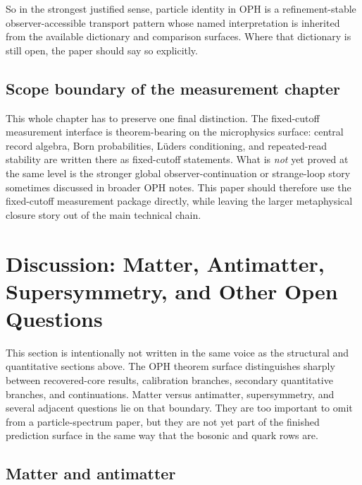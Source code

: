 \documentclass[11pt]{article}
\begin{document}
So in the strongest justified sense, particle identity in OPH is a refinement-stable
observer-accessible transport pattern whose named interpretation is inherited from the
available dictionary and comparison surfaces. Where that dictionary is still open, the paper should say
so explicitly.

\subsection{Scope boundary of the measurement chapter}

This whole chapter has to preserve one final distinction. The fixed-cutoff measurement interface
is theorem-bearing on the microphysics surface: central record algebra, Born
probabilities, L\"uders conditioning, and repeated-read stability are written there as
fixed-cutoff statements. What is \emph{not} yet proved at the same level is the stronger global
observer-continuation or strange-loop story sometimes discussed in broader OPH notes. This
paper should therefore use the fixed-cutoff measurement package directly, while leaving
the larger metaphysical closure story out of the main technical chain.

\section{Discussion: Matter, Antimatter, Supersymmetry, and Other Open Questions}

This section is intentionally not written in the same voice as the structural and quantitative
sections above. The OPH theorem surface distinguishes sharply between recovered-core
results, calibration branches, secondary quantitative branches, and continuations. Matter versus
antimatter, supersymmetry, and several adjacent questions lie on that boundary. They are too
important to omit from a particle-spectrum paper, but they are not yet part of the finished
prediction surface in the same way that the bosonic and quark rows are.

\subsection{Matter and antimatter}
\end{document}
